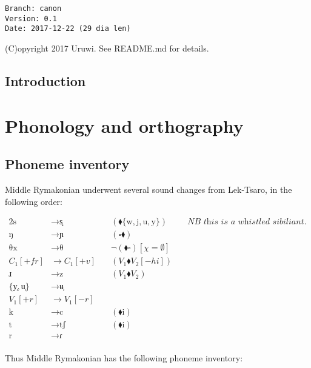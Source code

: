 \documentclass{book}
\newcommand{\lname}{Middle Rymakonian}
\begin{document}
\begin{verbatim}
Branch: canon
Version: 0.1
Date: 2017-12-22 (29 dia len)
\end{verbatim}

(C)opyright 2017 Uruwi. See README.md for details.

\tableofcontents

\section{Introduction}

\chapter{Phonology and orthography}

\section{Phoneme inventory}

\lname{} underwent several sound changes from Lek-Tsaro, in the following order:

\begin{alignat*}{2}
  \text{s} &\rightarrow \text{s͎} &\quad(\blacklozenge \{\text{w}, \text{j}, \text{u}, \text{y}\}) &\quad \textit{NB this is a whistled sibiliant.} \\
  \text{ŋ} &\rightarrow \text{ɲ} &\quad(\square \blacklozenge) \\
  \text{θx} &\rightarrow \text{θ} &\quad\lnot(\blacklozenge \square) [\chi = \emptyset] \\
  C_1[+fr] &\rightarrow C_1[+v] &\quad(V_1 \blacklozenge V_2[-hi]) \\
  \text{ɹ} &\rightarrow \text{z} &\quad(V_1 \blacklozenge V_2) \\
  \{\text{y̜}, \text{u̜}\} &\rightarrow \text{ʉ̜} \\
  V_1[+r] &\rightarrow V_1[-r] \\
  \text{k} &\rightarrow \text{c} &\quad (\blacklozenge \text{i}) \\
  \text{t} &\rightarrow \text{tʃ} &\quad (\blacklozenge \text{i}) \\
  \text{r} &\rightarrow \text{ɾ} \\
\end{alignat*}

Thus \lname{} has the following phoneme inventory:
\end{document}
